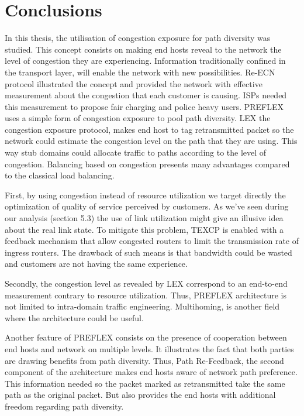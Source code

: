 \section{Conclusions}

In this thesis, the utilisation of congestion exposure for path diversity was studied. This concept consists on making end hosts reveal to the network the level of congestion they are experiencing. Information traditionally confined in the transport layer, will enable the network with new possibilities. Re-ECN protocol illustrated the concept and provided the network with effective measurement about the congestion that each customer is causing. ISPs needed this measurement to propose fair charging and police heavy users. PREFLEX uses a simple form of congestion exposure to pool path diversity. LEX the congestion exposure protocol, makes end host to tag retransmitted packet so the network could estimate the congestion level on the path that they are using. This way stub domains could allocate traffic to paths according to the level of congestion. Balancing based on congestion presents many advantages compared to the classical load balancing. 

First, by using congestion instead of resource utilization we target directly the optimization of quality of service perceived by customers. As we've seen during our analysis (section 5.3) the use of link utilization might give an illusive idea about the real link state.  To mitigate this problem, TEXCP is enabled with a feedback mechanism that allow congested routers to limit the transmission rate of  ingress routers. The drawback of such means is that bandwidth could be wasted and customers are not having the same experience.

Secondly, the congestion level as revealed by LEX correspond to an end-to-end measurement contrary to resource utilization. Thus, PREFLEX architecture is not limited to intra-domain traffic engineering. Multihoming, is another field where the architecture could be useful. 

Another feature of PREFLEX consists on the presence of cooperation between end hosts and network on multiple levels. It illustrates the fact that both parties are drawing benefits from path diversity. Thus, Path Re-Feedback, the second component of the architecture makes end hosts aware of network path preference. This information needed so the packet marked as retransmitted take the same path as the original packet. But also provides the end hosts with additional freedom regarding path diversity. 
 
